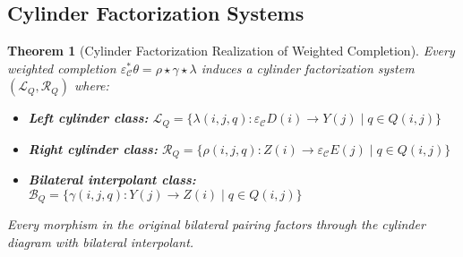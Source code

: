 \documentclass[11pt]{article}
\theoremstyle{plain}
\newtheorem{theorem}{Theorem}[section]
\theoremstyle{definition}
\theoremstyle{remark}
\newcommand{\C}{\mathcal{C}}
\begin{document}
\subsection{Cylinder Factorization Systems}

\begin{theorem}[Cylinder Factorization Realization of Weighted Completion]\label{thm:cylinder-factorization}
Every weighted completion $\varepsilon_\C^* \theta = \rho \star \gamma \star \lambda$ induces a cylinder factorization system $(\mathcal{L}_Q, \mathcal{R}_Q)$ where:
\begin{itemize}
\item \textbf{Left cylinder class:} $\mathcal{L}_Q = \{\lambda(i, j, q) : \varepsilon_\C D(i) \to Y(j) \mid q \in Q(i, j)\}$
\item \textbf{Right cylinder class:} $\mathcal{R}_Q = \{\rho(i, j, q) : Z(i) \to \varepsilon_\C E(j) \mid q \in Q(i, j)\}$
\item \textbf{Bilateral interpolant class:} $\mathcal{B}_Q = \{\gamma(i, j, q) : Y(j) \to Z(i) \mid q \in Q(i, j)\}$
\end{itemize}

Every morphism in the original bilateral pairing factors through the cylinder diagram with bilateral interpolant.
\end{theorem}
\end{document}
